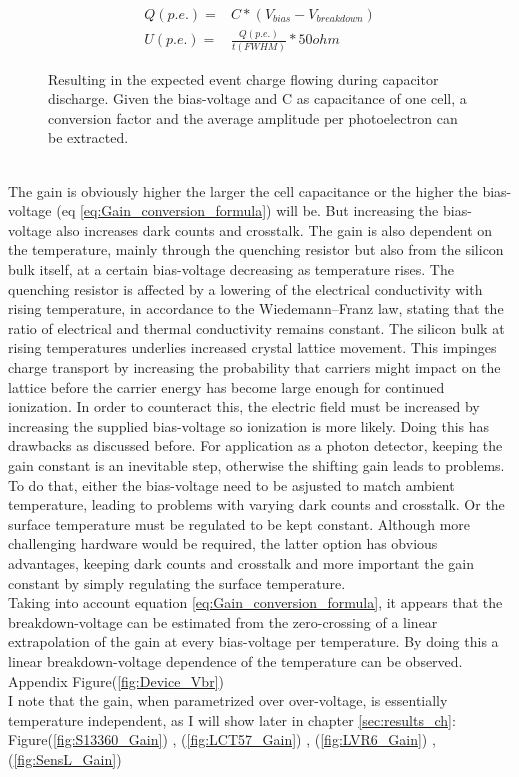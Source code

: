 \documentclass[article,type=msc,colorback,accentcolor=tud9c]{tudthesis}
\begin{document}
\begin{figure}[h]
\begin{equation}
\begin{split}
Q(p.e.) = & C * (V_{bias}-V_{breakdown})\\
U(p.e.) = & \frac{Q(p.e.)}{t(FWHM)} * 50ohm
\end{split}
\end{equation}
\caption{Resulting in the expected event charge flowing during capacitor discharge. Given the bias-voltage and C as capacitance of one cell, a conversion factor and the average amplitude per photoelectron can be extracted.}
\end{figure}\\
The gain is obviously higher the larger the cell capacitance or the higher the bias-voltage (eq \ref{eq:Gain_conversion_formula}) will be. But increasing the bias-voltage also increases dark counts and crosstalk. 
The gain is also dependent on the temperature, mainly through the quenching resistor but also from the silicon bulk itself, at a certain bias-voltage decreasing as temperature rises. The quenching resistor is affected by a lowering of the electrical conductivity with rising temperature, in accordance to the Wiedemann–Franz law, stating that the ratio of electrical and thermal conductivity remains constant. The silicon bulk at rising temperatures underlies increased crystal lattice movement. This impinges charge transport by increasing the probability that carriers might impact on the lattice before the carrier energy has become large enough for continued ionization. In order to counteract this, the electric field must be increased by increasing the supplied bias-voltage so ionization is more likely. Doing this has drawbacks as discussed before. For application as a photon detector, keeping the gain constant is an inevitable step, otherwise the shifting gain leads to problems. To do that, either the bias-voltage need to be asjusted to match ambient temperature, leading to problems with varying dark counts and crosstalk. Or the surface temperature must be regulated to be kept constant. Although more challenging hardware would be required, the latter option has obvious advantages, keeping dark counts and crosstalk and more important the gain constant by simply regulating the surface temperature.\\
Taking into account equation \ref{eq:Gain_conversion_formula}, it appears that the breakdown-voltage can be estimated from the zero-crossing of a linear extrapolation of the gain at every bias-voltage per temperature. By doing this a linear breakdown-voltage dependence of the temperature can be observed. Appendix Figure(\ref{fig:Device_Vbr})\\
I note that the gain, when parametrized over over-voltage, is essentially temperature independent, as I will show later in chapter \ref{sec:results_ch}: Figure(\ref{fig:S13360_Gain}) , (\ref{fig:LCT57_Gain}) , (\ref{fig:LVR6_Gain}) , (\ref{fig:SensL_Gain})\\
\end{document}
